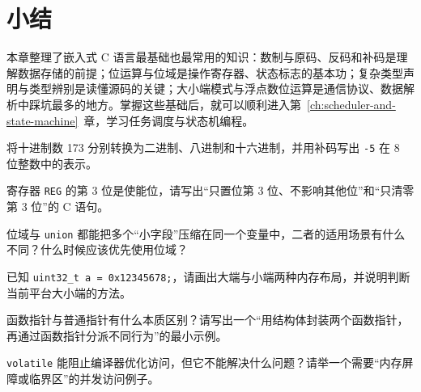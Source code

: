 \section{小结}

本章整理了嵌入式 C 语言最基础也最常用的知识：数制与原码、反码和补码是理解数据存储的前提；位运算与位域是操作寄存器、状态标志的基本功；复杂类型声明与类型辨别是读懂源码的关键；大小端模式与浮点数位运算是通信协议、数据解析中踩坑最多的地方。掌握这些基础后，就可以顺利进入第~\ref{ch:scheduler-and-state-machine}~章，学习任务调度与状态机编程。


\begin{problemset}
\item 将十进制数 173 分别转换为二进制、八进制和十六进制，并用补码写出 \texttt{-5} 在 8 位整数中的表示。
\item 寄存器 \texttt{REG} 的第 3 位是使能位，请写出“只置位第 3 位、不影响其他位”和“只清零第 3 位”的 C 语句。
\item 位域与 \texttt{union} 都能把多个“小字段”压缩在同一个变量中，二者的适用场景有什么不同？什么时候应该优先使用位域？
\item 已知 \texttt{uint32\_t a = 0x12345678;}，请画出大端与小端两种内存布局，并说明判断当前平台大小端的方法。
\item 函数指针与普通指针有什么本质区别？请写出一个“用结构体封装两个函数指针，再通过函数指针分派不同行为”的最小示例。
\item \texttt{volatile} 能阻止编译器优化访问，但它不能解决什么问题？请举一个需要“内存屏障或临界区”的并发访问例子。
\end{problemset}

